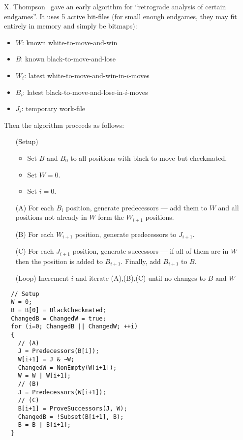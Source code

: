 \documentclass[10pt,dvipdfmx,letterpaper]{report}
\begin{document}
X. Thompson~\cite{thompson:endgame} gave an early algorithm for
``retrograde analysis of certain endgames''.  It uses 5 active bit-files (for small enough endgames,
they may fit entirely in memory and simply be bitmaps):
\begin{itemize}
  \item $W$: known white-to-move-and-win
  \item $B$: known black-to-move-and-lose
  \item $W_i$: latest white-to-move-and-win-in-$i$-moves
  \item $B_i$: latest black-to-move-and-lose-in-$i$-moves
  \item $J_i$: temporary work-file
\end{itemize}
Then the algorithm proceeds as follows:
\begin{itemize}
  \item[(Setup)]
    \begin{itemize}
      \item Set $B$ and $B_0$ to all positions with black to move but checkmated.
      \item Set $W=0$.
      \item Set $i=0$.
    \end{itemize}
  \item[(A)] For each $B_i$ position, generate predecessors --- add them to $W$
    and all positions not already in $W$ form the $W_{i+1}$ positions.
  \item[(B)] For each $W_{i+1}$ position, generate predecessors to $J_{i+1}$.
  \item[(C)] For each $J_{i+1}$ position, generate successors --- if all of them
    are in $W$ then the position is added to $B_{i+1}$.
    Finally, add $B_{i+1}$ to $B$.
  \item[(Loop)] Increment $i$ and iterate (A),(B),(C) until no changes to $B$ and $W$
\end{itemize}
\begin{verbatim}
  // Setup
  W = 0;
  B = B[0] = BlackCheckmated;
  ChangedB = ChangedW = true;
  for (i=0; ChangedB || ChangedW; ++i)
  {
    // (A)
    J = Predecessors(B[i]);
    W[i+1] = J & ~W;
    ChangedW = NonEmpty(W[i+1]);
    W = W | W[i+1];
    // (B)
    J = Predecessors(W[i+1]);
    // (C)
    B[i+1] = ProveSuccessors(J, W);
    ChangedB = !Subset(B[i+1], B);
    B = B | B[i+1];
  }
\end{verbatim}
\end{document}
